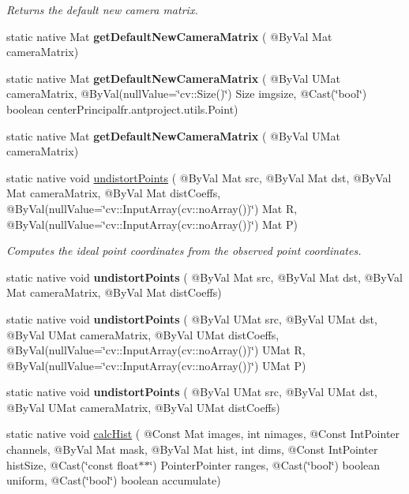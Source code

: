 \begin{DoxyCompactItemize}
\begin{DoxyCompactList}\small\item\em Returns the default new camera matrix. \end{DoxyCompactList}\item 
static native Mat {\bfseries get\+Default\+New\+Camera\+Matrix} ( @By\+Val Mat camera\+Matrix)
\item 
static native Mat {\bfseries get\+Default\+New\+Camera\+Matrix} ( @By\+Val U\+Mat camera\+Matrix, @By\+Val(null\+Value=\char`\"{}cv\+::\+Size()\char`\"{}) Size imgsize, @Cast(\char`\"{}bool\char`\"{}) boolean center\+Principal\+fr.antproject.utils.Point)
\item 
static native Mat {\bfseries get\+Default\+New\+Camera\+Matrix} ( @By\+Val U\+Mat camera\+Matrix)
\item 
static native void \hyperlink{group__imgproc__transform_gaacf4ed74dd09b28d673cc4b0f0257aa8}{undistort\+Points} ( @By\+Val Mat src, @By\+Val Mat dst, @By\+Val Mat camera\+Matrix, @By\+Val Mat dist\+Coeffs, @By\+Val(null\+Value=\char`\"{}cv\+::\+Input\+Array(cv\+::no\+Array())\char`\"{}) Mat R, @By\+Val(null\+Value=\char`\"{}cv\+::\+Input\+Array(cv\+::no\+Array())\char`\"{}) Mat P)
\begin{DoxyCompactList}\small\item\em Computes the ideal point coordinates from the observed point coordinates. \end{DoxyCompactList}\item 
static native void {\bfseries undistort\+Points} ( @By\+Val Mat src, @By\+Val Mat dst, @By\+Val Mat camera\+Matrix, @By\+Val Mat dist\+Coeffs)
\item 
static native void {\bfseries undistort\+Points} ( @By\+Val U\+Mat src, @By\+Val U\+Mat dst, @By\+Val U\+Mat camera\+Matrix, @By\+Val U\+Mat dist\+Coeffs, @By\+Val(null\+Value=\char`\"{}cv\+::\+Input\+Array(cv\+::no\+Array())\char`\"{}) U\+Mat R, @By\+Val(null\+Value=\char`\"{}cv\+::\+Input\+Array(cv\+::no\+Array())\char`\"{}) U\+Mat P)
\item 
static native void {\bfseries undistort\+Points} ( @By\+Val U\+Mat src, @By\+Val U\+Mat dst, @By\+Val U\+Mat camera\+Matrix, @By\+Val U\+Mat dist\+Coeffs)
\item 
static native void \hyperlink{group__imgproc__hist_ga5d3d264cae4eeaf1ffac100661154b5a}{calc\+Hist} ( @Const Mat images, int nimages, @Const Int\+Pointer channels, @By\+Val Mat mask, @By\+Val Mat hist, int dims, @Const Int\+Pointer hist\+Size, @Cast(\char`\"{}const float$\ast$$\ast$\char`\"{}) Pointer\+Pointer ranges, @Cast(\char`\"{}bool\char`\"{}) boolean uniform, @Cast(\char`\"{}bool\char`\"{}) boolean accumulate)
$$
\end{DoxyCompactItemize}
